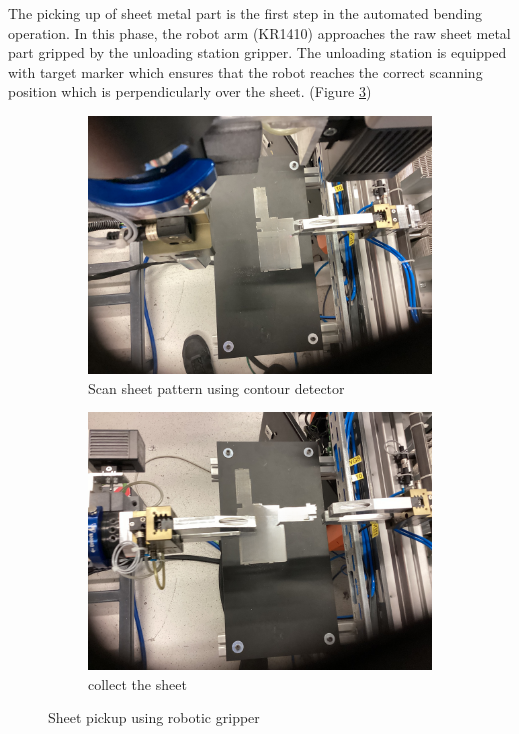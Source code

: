 The picking up of sheet metal part is the first step in the automated bending operation. In this phase, the robot arm (KR1410) approaches the raw sheet metal part gripped by the unloading station gripper. The unloading station is equipped with target marker which ensures that the robot reaches the correct scanning position which is perpendicularly over the sheet. (Figure \ref{fig:sheet-pickup})


\begin{figure}[h]
    \centering
    \begin{subfigure}[b]{0.48\textwidth}
        \centering
        \includegraphics[width=\textwidth]{figures/sheet-pickup/scan.png}
        \caption{Scan sheet pattern using contour detector}
        \label{subfig:sheet-scan}
    \end{subfigure}\hspace{0.1cm}
    \begin{subfigure}[b]{0.48\textwidth}
        \centering
        \includegraphics[width=\textwidth]{figures/sheet-pickup/taken.png}
        \caption{collect the sheet}
        \label{subfig:sheet-taken}
    \end{subfigure}
    \caption{Sheet pickup using robotic gripper}
    \label{fig:sheet-pickup}
\end{figure}

